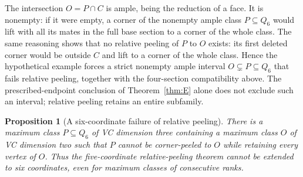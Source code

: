 \documentclass[11pt]{article}
\numberwithin{equation}{section}
\newtheorem{proposition}[theorem]{Proposition}
\theoremstyle{definition}
\theoremstyle{remark}
\begin{document}
The intersection $O=P\cap C$ is ample, being the reduction of a face.
It is nonempty: if it were empty, a corner of the nonempty ample class
$P\subseteq Q_6$ would lift with all its mates in the full base section
to a corner of the whole class. The same reasoning shows that no
relative peeling of $P$ to $O$ exists: its first deleted corner would
be outside $C$ and lift to a corner of the whole class. Hence the
hypothetical example forces a strict nonempty ample interval
$O\subsetneq P\subseteq Q_6$ that fails relative peeling, together
with the four-section compatibility above. The prescribed-endpoint
conclusion of Theorem~\ref{thm:E} alone does not exclude such an
interval; relative peeling retains an entire subfamily.

\begin{proposition}[A six-coordinate failure of relative peeling]
\label{prop:relative-six-coordinate-counterexample}
There is a maximum class $P\subseteq Q_6$ of VC dimension three
containing a maximum class $O$ of VC dimension two such that $P$
cannot be corner-peeled to $O$ while retaining every vertex of $O$.
Thus the five-coordinate relative-peeling theorem cannot be extended
to six coordinates, even for maximum classes of consecutive ranks.
\end{proposition}
\end{document}
